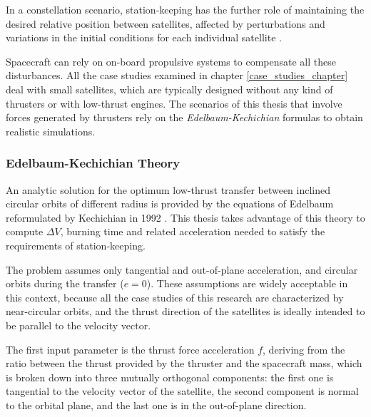In a constellation scenario, station-keeping has the further role of maintaining the desired relative position between satellites, affected by perturbations and variations in the initial conditions for each individual satellite \cite{wertz2009orbit}.

Spacecraft can rely on on-board propulsive systems to compensate all these disturbances.
All the case studies examined in chapter \ref{case_studies_chapter} deal with small satellites, which are typically designed without any kind of thrusters or with low-thrust engines.  
The scenarios of this thesis that involve forces generated by thrusters rely on the \textit{Edelbaum-Kechichian} formulas to obtain realistic simulations.


\subsubsection{Edelbaum-Kechichian Theory}
An analytic solution for the optimum low-thrust transfer between inclined circular orbits of different radius is provided by the equations of Edelbaum reformulated by Kechichian in 1992 \cite{edelbaum1961propulsion, kechichian1992reformulation}.
This thesis takes advantage of this theory to compute $\Delta V$, burning time and related acceleration needed to satisfy the requirements of station-keeping.

The problem assumes only tangential and out-of-plane acceleration, and circular orbits during the transfer ($e = 0$).
These assumptions are widely acceptable in this context, because all the case studies of this research are characterized by near-circular orbits, and the thrust direction of the satellites is ideally intended to be parallel to the velocity vector.

The first input parameter is the thrust force acceleration $f$, deriving from the ratio between the thrust provided by the thruster and the spacecraft mass, which is broken down into three mutually orthogonal components:
the first one is tangential to the velocity vector of the satellite, the second component is normal to the orbital plane, and the last one is in the out-of-plane direction.
 
